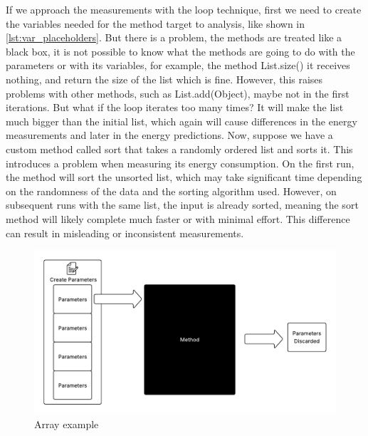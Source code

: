 If we approach the measurements with the loop technique, first we need to create the variables needed for the method target to analysis, like shown in \ref{lst:var_placeholders}. But there is a problem, the methods are treated like a black box, it is not possible to know what the methods are going to do with the parameters or with its variables, for example, the method List.size() it receives nothing, and return the size of the list which is fine. However, this raises problems with other methods, such as List.add(Object), maybe not in the first iterations. But what if the loop iterates too many times? It will make the list much bigger than the initial list, which again will cause differences in the energy measurements and later in the energy predictions. 
Now, suppose we have a custom method called sort that takes a randomly ordered list and sorts it. This introduces a problem when measuring its energy consumption. On the first run, the method will sort the unsorted list, which may take significant time depending on the randomness of the data and the sorting algorithm used. However, on subsequent runs with the same list, the input is already sorted, meaning the sort method will likely complete much faster or with minimal effort. This difference can result in misleading or inconsistent measurements.

\begin{figure}[htbp]
  \centering
  \includegraphics[width = 1 \textwidth]{figures/array.pdf}
  \caption{Array example}
  \label{fig:array}
\end{figure}

